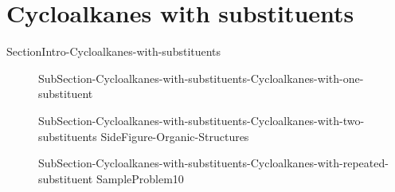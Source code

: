\documentclass[main.tex]{subfiles}
\newcommand\chapterlabel{Ch-orgo}\setcounter{figurenewcounter}{0}\setcounter{tablenewcounter}{0}\setcounter{formulanewcounter}{0}
\begin{document}
\section{Cycloalkanes with substituents}{SectionIntro-Cycloalkanes-with-substituents}
\sloppy
\begin{description}
\item[]{SubSection-Cycloalkanes-with-substituents-Cycloalkanes-with-one-substituent}
\item[] {SubSection-Cycloalkanes-with-substituents-Cycloalkanes-with-two-substituents}
{SideFigure-Organic-Structures}
\item[]{SubSection-Cycloalkanes-with-substituents-Cycloalkanes-with-repeated-substituent}
{SampleProblem10}

\end{description}
\end{document}
